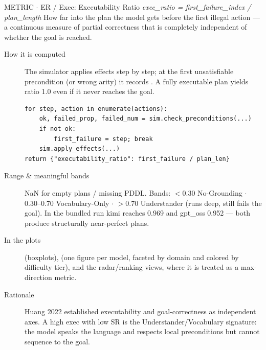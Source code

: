 \begin{bmmcard}{METRIC \(\cdot\) ER / Exec: Executability Ratio}
\emph{exec\_ratio = first\_failure\_index / plan\_length}
How far into the plan the model gets before the first illegal action --- a continuous measure of partial correctness that is completely independent of whether the goal is reached.
\begin{description}
\item[How it is computed] The simulator applies effects step by step; at the first unsatisfiable precondition (or wrong arity) it records . A fully executable plan yields ratio 1.0 even if it never reaches the goal.

\begin{lstlisting}
for step, action in enumerate(actions):
    ok, failed_prop, failed_num = sim.check_preconditions(...)
    if not ok:
        first_failure = step; break
    sim.apply_effects(...)
return {"executability_ratio": first_failure / plan_len}
\end{lstlisting}
\item[Range \& meaningful bands] NaN for empty plans / missing PDDL. Bands: \(<0.30\) No-Grounding \(\cdot\) 0.30--0.70 Vocabulary-Only \(\cdot\) \(>0.70\) Understander (runs deep, still fails the goal). In the bundled run kimi reaches 0.969 and gpt\_oss 0.952 --- both produce structurally near-perfect plans.
\item[In the plots] \raggedright
{} (boxplots),\allowbreak{}
 (one figure per model, faceted by domain and colored by difficulty tier),\allowbreak{}
and the radar/ranking views, where it is treated as a max-direction metric.
\item[Rationale] Huang 2022 established executability and goal-correctness as independent axes. A high exec with low SR is the Understander/Vocabulary signature: the model speaks the language and respects local preconditions but cannot sequence to the goal.
\end{description}
\end{bmmcard}

